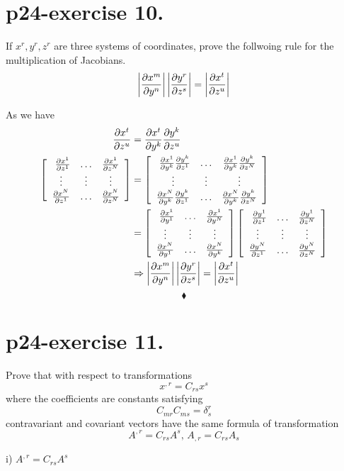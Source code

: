 \section{p24-exercise 10.}
\begin{tcolorbox}
If $x^r, y^r, z^r$ are three systems of coordinates, prove the follwoing rule for the multiplication of Jacobians.
$$\left|\pdv{x^m}{y^n}\right|\left|\pdv{y^r}{z^s}\right| = \left|\pdv{x^t}{z^u}\right|$$
\end{tcolorbox}
 As we have  
\begin{align}
\pdv{x^t}{z^u} &=\pdv{x^t}{y^k} \pdv{y^k}{z^u}\\
 \left[ { \begin{array}{ccc}
   \ \pdv{x^1}{z^1} & \dots & \pdv{x^1}{z^N}\\
   \vdots & \vdots & \vdots\\
    \pdv{x^N}{z^1} & \dots & \pdv{x^N}{z^N}\\
  \end{array}} \right] &= \left[ { \begin{array}{ccc}
   \ \pdv{x^1}{y^k}\pdv{y^k}{z^1} & \dots & \pdv{x^1}{y^k}\pdv{y^k}{z^N}\\
   \vdots & \vdots & \vdots\\
    \pdv{x^N}{y^k}\pdv{y^k}{z^1}& \dots & \pdv{x^N}{y^k}\pdv{y^k}{z^N}\\
  \end{array}} \right]\\
  &= \left[ { \begin{array}{ccc}
   \ \pdv{x^1}{y^1}& \dots & \pdv{x^1}{y^N}\\
   \vdots & \vdots & \vdots\\
    \pdv{x^N}{y^1}& \dots & \pdv{x^N}{y^k}\\
  \end{array}} \right]\left[ { \begin{array}{ccc}
   \ \pdv{y^1}{z^1} & \dots & \pdv{y^1}{z^N}\\
   \vdots & \vdots & \vdots\\
    \pdv{y^N}{z^1}& \dots & \pdv{y^N}{z^N}\\
  \end{array}} \right]\\
  \ & \Rightarrow \left|\pdv{x^m}{y^n}\right|\left|\pdv{y^r}{z^s}\right| = \left|\pdv{x^t}{z^u}\right|
  \end{align}
$$\blacklozenge$$
\pagebreak[4]


\section{p24-exercise 11.}
\begin{tcolorbox}
Prove that with respect to transformations $$ x^{,r} = C_{rs}x^s$$ where the coefficients are constants satisfying $$C_{mr}C_{ms} = \delta^r_s$$ contravariant and covariant vectors have the same formula of transformation $$ A^{,r} = C_{rs}A^{s} \text{, } A_{,r} = C_{rs}A_{s} $$
\end{tcolorbox}
 i) $ A^{,r} = C_{rs}A^{s}$\\
 
